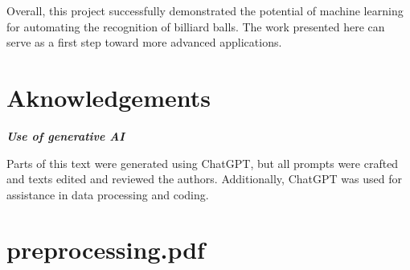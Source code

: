 \documentclass{article}
\begin{document}
Overall, this project successfully demonstrated the potential of machine learning for automating the recognition of billiard balls. The work presented here can serve as a first step toward more advanced applications.

\pagebreak
\section{Aknowledgements}
\textbf{\textit{Use of generative AI}}

Parts of this text were generated using ChatGPT, but all prompts were crafted and texts edited and reviewed the authors. Additionally, ChatGPT was used for assistance in data processing and coding.


\printbibliography


\appendix
\section{preprocessing.pdf}

% 
\end{document}
